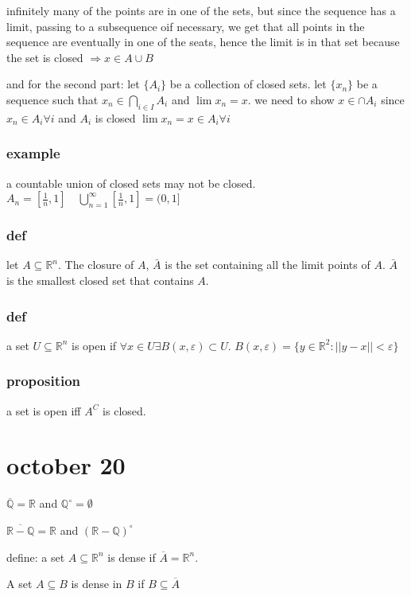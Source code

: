 \documentclass[letterpaper]{article}
\begin{document}
infinitely many of the points are in one of the sets, but since the sequence has a limit, passing to a subsequence oif necessary, we get that all points in the sequence are eventually in one of the seats, hence the limit is in that set because the set is closed $\Rightarrow x\in A\cup B$

and for the second part:
let $\{A_i\}$ be a collection of closed sets. let $\{x_n\}$ be a sequence such that $x_n\in\bigcap_{i\in I}A_i$ and $\lim x_n=x$. we need to show $x\in \cap A_i$ since $x_n\in A_i\forall i$ and $A_i$ is closed $\lim x_n=x\in A_i\forall i$


\subsubsection*{example}
a countable union of closed sets may not be closed. $A_n=[\frac{1}{n},1]\quad \bigcup_{n=1}^\infty[\frac{1}{n},1]=(0,1]$

\subsubsection*{def}
let $A\subseteq\mathbb{R}^n$. The closure of $A$, $\bar{A}$ is the set containing all the limit points of $A$. $\bar{A}$ is the smallest closed set that contains $A$.

\subsubsection*{def}
a set $U\subseteq \mathbb{R}^n$ is open if $\forall x\in U\exists B(x,\varepsilon)\subset U$. $B(x,\varepsilon)=\{y\in \mathbb{R}^2:||y-x||<\varepsilon\}$

\subsubsection*{proposition}
a set is open iff $A^C$ is closed.

\section*{october 20}
$\overline{\mathbb{Q}}=\mathbb{R}$ and $\mathbb{Q}^\circ=\emptyset$

$\overline{\mathbb{R}-\mathbb{Q}}=\mathbb{R}$ and $(\mathbb{R}-\mathbb{Q})^\circ$

define: a set $A\subseteq\mathbb{R}^n$ is dense if $\overline{A}=\mathbb{R}^n$.

A set $A\subseteq B$ is dense in $B$ if $B\subseteq\overline A$
\end{document}
